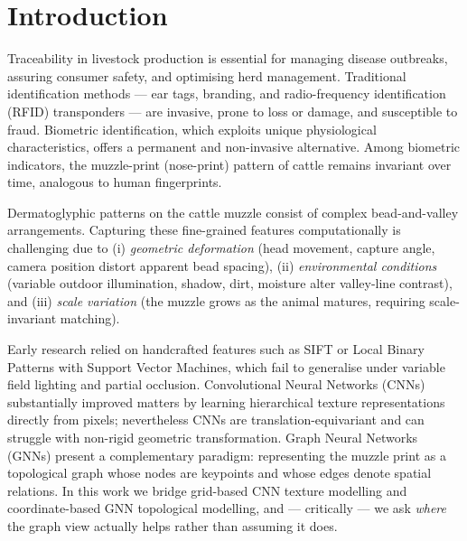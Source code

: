 \documentclass[11pt]{article}
\begin{document}
\begin{abstract}
(97.0\% Rank-1 on 24 identities; 87.0\% across 308 unseen identities), that a substantial
component of the residual cross-domain verification gap is attributable to \emph{score
mis-calibration} and is largely recovered by unsupervised S-norm, and --- via a controlled
corruption study --- that a single
validation-tuned fusion weight inherits the graph branch's clean-data verification gain
while gracefully collapsing to the robust CNN under severe corruption, whereas
per-sample quality-adaptive gating does not improve on it. Finally, we move beyond
qualitative saliency with a \emph{causal} explainability protocol (node-ablation
faithfulness and Hybrid pathway intervention), characterising how the models attend to
dermatoglyphic structure.
\end{abstract}

\section{Introduction}
Traceability in livestock production is essential for managing disease outbreaks,
assuring consumer safety, and optimising herd management. Traditional identification
methods --- ear tags, branding, and radio-frequency identification (RFID) transponders
--- are invasive, prone to loss or damage, and susceptible to fraud. Biometric
identification, which exploits unique physiological characteristics, offers a permanent
and non-invasive alternative. Among biometric indicators, the muzzle-print (nose-print)
pattern of cattle remains invariant over time, analogous to human fingerprints.

Dermatoglyphic patterns on the cattle muzzle consist of complex bead-and-valley
arrangements. Capturing these fine-grained features computationally is challenging due to
(i) \emph{geometric deformation} (head movement, capture angle, camera position distort
apparent bead spacing), (ii) \emph{environmental conditions} (variable outdoor
illumination, shadow, dirt, moisture alter valley-line contrast), and (iii) \emph{scale
variation} (the muzzle grows as the animal matures, requiring scale-invariant matching).

Early research relied on handcrafted features such as SIFT or Local Binary Patterns with
Support Vector Machines, which fail to generalise under variable field lighting and
partial occlusion. Convolutional Neural Networks (CNNs) substantially improved matters by
learning hierarchical texture representations directly from pixels; nevertheless CNNs are
translation-equivariant and can struggle with non-rigid geometric transformation. Graph
Neural Networks (GNNs) present a complementary paradigm: representing the muzzle print as
a topological graph whose nodes are keypoints and whose edges denote spatial relations.
In this work we bridge grid-based CNN texture modelling and coordinate-based GNN
topological modelling, and --- critically --- we ask \emph{where} the graph view actually
helps rather than assuming it does.
\end{document}
